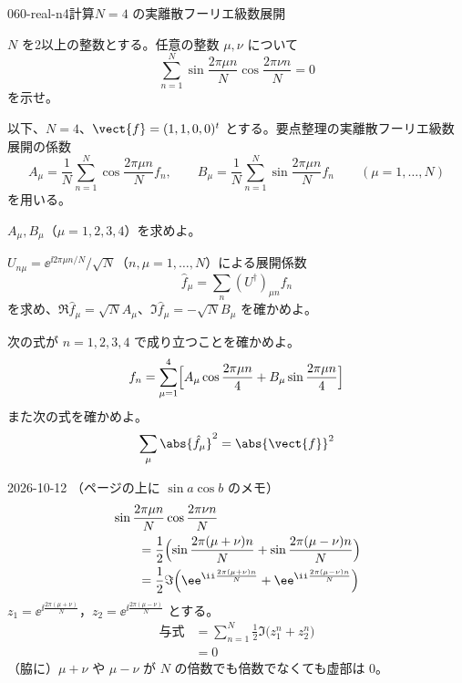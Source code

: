 \documentclass[uplatex,dvipdfmx,a4paper,11pt]{jsarticle}
\begin{document}
\begin{mondai}{060-real-n4}{計算}{$N=4$ の実離散フーリエ級数展開}
\begin{shoumon}
  \item $N$ を2以上の整数とする。任意の整数 $\mu,\nu$ について
\[
\sum_{n=1}^{N}\sin\frac{2\pi\mu n}{N}\cos\frac{2\pi\nu n}{N}=0
\]
を示せ。
\end{shoumon}

以下、$N=4$、$\vect{f}=(1,1,0,0)^{t}$ とする。要点整理の実離散フーリエ級数展開の係数
\[
A_{\mu}=\frac{1}{N}\sum_{n=1}^{N}\cos\frac{2\pi\mu n}{N}f_n,\qquad B_{\mu}=\frac{1}{N}\sum_{n=1}^{N}\sin\frac{2\pi\mu n}{N}f_n\qquad(\mu=1,\dots,N)
\]
を用いる。
\begin{shoumon}[resume]
  \item $A_{\mu},B_{\mu}$（$\mu=1,2,3,4$）を求めよ。
  \item $U_{n\mu}=\ee^{\ii2\pi\mu n/N}/\sqrt{N}$（$n,\mu=1,\dots,N$）による展開係数
\[
\hat{f}_{\mu}=\sum_{n}(U^{\dagger})_{\mu n}f_n
\]
を求め、$\Re\hat{f}_{\mu}=\sqrt{N}A_{\mu}$、$\Im\hat{f}_{\mu}=-\sqrt{N}B_{\mu}$ を確かめよ。
  \item 次の式が $n=1,2,3,4$ で成り立つことを確かめよ。
\[
f_n=\sum_{\mu=1}^{4}\Bigl[A_{\mu}\cos\frac{2\pi\mu n}{4}+B_{\mu}\sin\frac{2\pi\mu n}{4}\Bigr]
\]
また次の式を確かめよ。
\[
\sum_{\mu}\abs{\hat{f}_{\mu}}^{2}=\abs{\vect{f}}^{2}
\]
\end{shoumon}
\begin{kotaeutsushi}{2026-10-12}
（ページの上に $\sin a\cos b$ のメモ）
\begin{align*}
  &\sin\frac{2\pi\mu n}{N}\cos\frac{2\pi\nu n}{N}\\
  &\qquad=\frac{1}{2}\Bigl(\sin\frac{2\pi(\mu+\nu)n}{N}+\sin\frac{2\pi(\mu-\nu)n}{N}\Bigr)\\
  &\qquad=\frac{1}{2}\Im\Bigl(\ee^{\ii\frac{2\pi(\mu+\nu)n}{N}}+\ee^{\ii\frac{2\pi(\mu-\nu)n}{N}}\Bigr)
\end{align*}
$z_1=\ee^{\ii\frac{2\pi(\mu+\nu)}{N}}$，$z_2=\ee^{\ii\frac{2\pi(\mu-\nu)}{N}}$ とする。
\begin{align*}
  \text{与式}&=\sum_{n=1}^{N}\frac{1}{2}\Im\bigl(z_1^{n}+z_2^{n}\bigr)\\
  &=0
\end{align*}
（脇に）$\mu+\nu$ や $\mu-\nu$ が $N$ の倍数でも倍数でなくても虚部は 0。

\end{kotaeutsushi}
\end{mondai}
\end{document}
